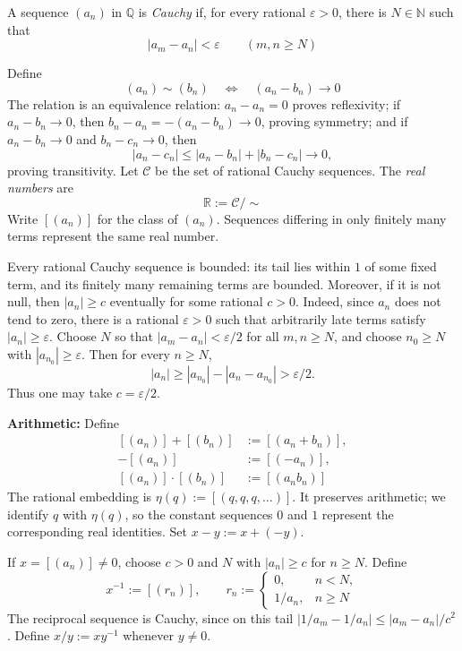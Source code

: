 \documentclass[a4paper,11pt,abstracton]{scrartcl}
\newcommand{\RR}{\mathbb{R}}
\newcommand{\NN}{\mathbb{N}}
\newcommand{\QQ}{\mathbb{Q}}
\theoremstyle{dotlessP}
\theoremstyle{dotlessS}
\theoremstyle{remark}
\theoremstyle{definition}
\begin{document}
\begin{definition_box}
A sequence $(a_n)$ in $\QQ$ is \emph{Cauchy} if, for every rational
$\varepsilon>0$, there is $N\in\NN$ such that
\[
    |a_m-a_n|<\varepsilon\qquad(m,n\ge N)
\]

Define
\[
    (a_n)\sim(b_n)\quad\Longleftrightarrow\quad(a_n-b_n) \rightarrow 0
\]
The relation is an equivalence relation: $a_n-a_n=0$ proves
reflexivity; if $a_n-b_n\to0$, then
$b_n-a_n=-(a_n-b_n)\to0$, proving symmetry; and if
$a_n-b_n\to0$ and $b_n-c_n\to0$, then
\[
 |a_n-c_n|\le|a_n-b_n|+|b_n-c_n|\to0,
\]
proving transitivity. Let $\mathcal C$ be the set of rational Cauchy
sequences. The \emph{real numbers} are
\[
    \RR:=\mathcal C/\sim
\]
Write $[(a_n)]$ for the class of $(a_n)$. Sequences differing in only
finitely many terms represent the same real number.
\end{definition_box}

Every rational Cauchy sequence is bounded: its tail lies within $1$ of
some fixed term, and its finitely many remaining terms are bounded.
Moreover, if it is not null, then $|a_n|\ge c$ eventually for some
rational $c>0$. Indeed, since $a_n$ does not tend to zero, there is a
rational $\varepsilon>0$ such that arbitrarily late terms satisfy
$|a_n|\ge\varepsilon$. Choose $N$ so that
$|a_m-a_n|<\varepsilon/2$ for all $m,n\ge N$, and choose
$n_0\ge N$ with $|a_{n_0}|\ge\varepsilon$. Then for every $n\ge N$,
\[
 |a_n|\ge |a_{n_0}|-|a_n-a_{n_0}|>\varepsilon/2.
\]
Thus one may take $c=\varepsilon/2$.

\begin{claim_box}
\textbf{Arithmetic:} Define
\[
\begin{aligned}
    [(a_n)]+[(b_n)]&:=[(a_n+b_n)],\\
    -[(a_n)]&:=[(-a_n)],\\
    [(a_n)]\cdot[(b_n)]&:=[(a_nb_n)]
\end{aligned}
\]
The rational embedding is $\eta(q):=[(q,q,q,\ldots)]$.
It preserves arithmetic; we identify $q$ with $\eta(q)$, so the constant
sequences $0$ and $1$ represent the corresponding real identities.
Set $x-y:=x+(-y)$.

If $x=[(a_n)]\ne0$, choose $c>0$ and $N$ with $|a_n|\ge c$ for
$n\ge N$. Define
\[
    x^{-1}:=[(r_n)],\qquad
    r_n:=\begin{cases}0,&n<N,\\1/a_n,&n\ge N\end{cases}
\]
The reciprocal sequence is Cauchy, since on this tail
$|1/a_m-1/a_n|\le |a_m-a_n|/c^2$.
Define $x/y:=xy^{-1}$ whenever $y\ne0$.
\end{claim_box}
\end{document}
